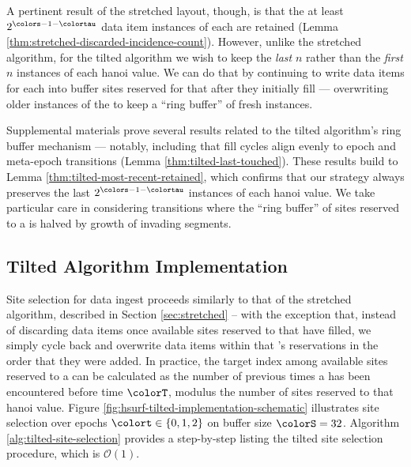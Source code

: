 A pertinent result of the stretched layout, though, is that the at least $2^{\colors - 1 - \colortau}$ data item instances of each \hv{} are retained (Lemma \ref{thm:stretched-discarded-incidence-count}).
However, unlike the stretched algorithm, for the tilted algorithm we wish to keep the \textit{last} $n$ rather than the \textit{first} $n$ instances of each hanoi value.
We can do that by continuing to write data items for each \hv{} into buffer sites reserved for that \hv{} after they initially fill --- overwriting older instances of the \hv{} to keep a ``ring buffer'' of fresh \hv{} instances.

Supplemental materials prove several results related to the tilted algorithm's ring buffer mechanism --- notably, including that fill cycles align evenly to epoch and meta-epoch transitions (Lemma \ref{thm:tilted-last-touched}).
These results build to Lemma \ref{thm:tilted-most-recent-retained}, which confirms that our strategy always preserves the last $2^{\colors - 1 - \colortau}$ instances of each hanoi value.
We take particular care in considering transitions where the ``ring buffer'' of sites reserved to a \hv{} is halved by growth of invading segments.

\subsection{Tilted Algorithm Implementation}
\label{sec:tilted-implementation}



Site selection for data ingest proceeds similarly to that of the stretched algorithm, described in Section \ref{sec:stretched} -- with the exception that, instead of discarding data items once available sites reserved to that \hv{} have filled, we simply cycle back and overwrite data items within that \hv{}'s reservations in the order that they were added.
In practice, the target index among available sites reserved to a \hv{} can be calculated as the number of previous times a \hv{} has been encountered before time $\colorT$, modulus the number of sites reserved to that hanoi value.
Figure \ref{fig:hsurf-tilted-implementation-schematic} illustrates site selection over epochs $\colort \in \{0,1,2\}$ on buffer size $\colorS=32$.
Algorithm \ref{alg:tilted-site-selection} provides a step-by-step listing the tilted site selection procedure, which is $\mathcal{O}(1)$.



